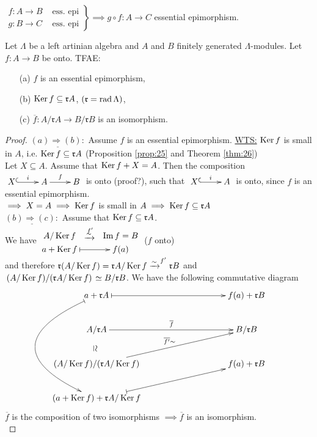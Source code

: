 \begin{exer}
$\left.
\begin{matrix}
f\colon A \to B & \text{ ess. epi}\\
g\colon B \to C & \text{ ess. epi}
\end{matrix}  
\right\rbrace \implies g\circ f \colon A \to C$ essential epimorphism.
\end{exer}


\begin{prop}\label{prop:28}
  Let $\Lambda$ be a left artinian algebra and $A$ and $B$ finitely
  generated $\Lambda$-modules. Let $f \colon A \to B$ be onto. TFAE: 
\begin{enumerate}
\item[(a)] $f$ is an essential epimorphism,
\item[(b)] $\operatorname{Ker}\nolimits f \subseteq \mathfrak{r}A$, $(\mathfrak{r} = \operatorname{rad}\nolimits
  \Lambda)$, 
\item[(c)] $\overline{f}\colon A / \mathfrak{r}A \to B / \mathfrak{r}B$ is an isomorphism.
\end{enumerate}
\begin{proof}
$\underline{(a)\Rightarrow(b):}$ Assume $f$ is an essential epimorphism. \underline{WTS:} $\operatorname{Ker}\nolimits f$ is small in $A$, i.e. $\operatorname{Ker}\nolimits f \subseteq \mathfrak{r}A$ (Proposition \ref{prop:25} and Theorem \ref{thm:26})\\ %
Let $X \subseteq A$. Assume that $\operatorname{Ker}\nolimits f + X = A$. Then the composition $\xymatrix{
X\ar@{^{(}->}[r]^i & A\ar[r]^f & B
}$ is onto (proof?), such that $\xymatrix{
X\ar@{^{(}->}[r]^i & A
}$ is onto, since $f$ is an essential epimorphism.\\
$\implies X = A \implies \operatorname{Ker}\nolimits f$ is small in $A \implies \operatorname{Ker}\nolimits f \subseteq \mathfrak{r}A$\\

$\underline{(b)\Rightarrow(c):}$ Assume that $\operatorname{Ker}\nolimits f \subseteq \mathfrak{r}A$. \\
We have
$\vcenter{\xymatrix@R-2pc{
A/\Ker f \ar@{}[r]|-*[@]{\xrightarrow{\sim}}^{f'} & \Im f = B\\
a + \Ker f \ar@{|->}[r] & f(a)
}}$ ($f$ onto)\\
and therefore $\mathfrak{r}(A / \operatorname{Ker}\nolimits f) = \mathfrak{r}A / \operatorname{Ker}\nolimits f \xrightarrow{\sim}^{f'} \mathfrak{r}B$ and $
\left.\left(A / \operatorname{Ker}\nolimits f \right) \middle/\left(\mathfrak{r}A / \operatorname{Ker}\nolimits f
  \right) \right. \simeq B/\mathfrak{r}B$.  We have the following
commutative diagram
$$\xymatrix@C8pc{
a + \mathfrak{r}A \ar@{|->}[r] \ar@{|->}@/_6pc/[ddd] & f(a) + \mathfrak{r}B\\
A / \mathfrak{r}A \ar[r]^{\overline{f}} \ar@{}[d]|-*[@]{\simeq} & B / \mathfrak{r}B\\
\left.\left(A / \Ker f \right) \middle/\left(\mathfrak{r}A / \Ker f \right) \right. \ar[ur]^{\overline{f'}\sim} & f(a) + \mathfrak{r}B\\
(a + \Ker f) + \mathfrak{r}A / \Ker f \ar@{|->}[ur]
}$$
$\overline{f}$ is the composition of two isomorphisms $\implies \overline{f}$ is an isomorphism.\\


\end{proof}
\end{prop}
